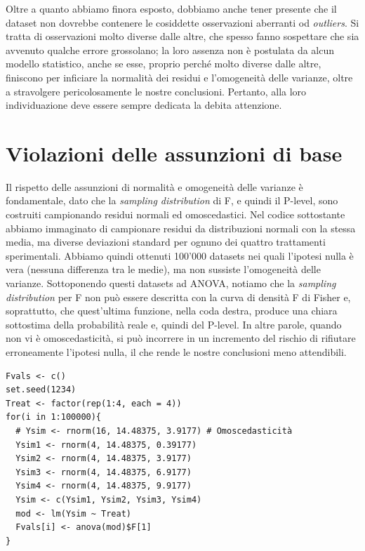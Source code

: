 \documentclass[a4paper,12pt,oneside]{book}
\begin{document}
Oltre a quanto abbiamo finora esposto, dobbiamo anche tener presente che il dataset non dovrebbe contenere le cosiddette osservazioni aberranti od \emph{outliers}. Si tratta di osservazioni molto diverse dalle altre, che spesso fanno sospettare che sia avvenuto qualche errore grossolano; la loro assenza non è postulata da alcun modello statistico, anche se esse, proprio perché molto diverse dalle altre, finiscono per inficiare la normalità dei residui e l'omogeneità delle varianze, oltre a stravolgere pericolosamente le nostre conclusioni. Pertanto, alla loro individuazione deve essere sempre dedicata la debita attenzione.

\hypertarget{violazioni-delle-assunzioni-di-base}{%
\section{Violazioni delle assunzioni di base}\label{violazioni-delle-assunzioni-di-base}}

Il rispetto delle assunzioni di normalità e omogeneità delle varianze è fondamentale, dato che la \emph{sampling distribution} di F, e quindi il P-level, sono costruiti campionando residui normali ed omoscedastici. Nel codice sottostante abbiamo immaginato di campionare residui da distribuzioni normali con la stessa media, ma diverse deviazioni standard per ognuno dei quattro trattamenti sperimentali. Abbiamo quindi ottenuti 100'000 datasets nei quali l'ipotesi nulla è vera (nessuna differenza tra le medie), ma non sussiste l'omogeneità delle varianze. Sottoponendo questi datasets ad ANOVA, notiamo che la \emph{sampling distribution} per F non può essere descritta con la curva di densità F di Fisher e, soprattutto, che quest'ultima funzione, nella coda destra, produce una chiara sottostima della probabilità reale e, quindi del P-level. In altre parole, quando non vi è omoscedasticità, si può incorrere in un incremento del rischio di rifiutare erroneamente l'ipotesi nulla, il che rende le nostre conclusioni meno attendibili.

\begin{verbatim}
Fvals <- c()
set.seed(1234)
Treat <- factor(rep(1:4, each = 4))
for(i in 1:100000){
  # Ysim <- rnorm(16, 14.48375, 3.9177) # Omoscedasticità
  Ysim1 <- rnorm(4, 14.48375, 0.39177)
  Ysim2 <- rnorm(4, 14.48375, 3.9177)
  Ysim3 <- rnorm(4, 14.48375, 6.9177)
  Ysim4 <- rnorm(4, 14.48375, 9.9177)
  Ysim <- c(Ysim1, Ysim2, Ysim3, Ysim4)
  mod <- lm(Ysim ~ Treat)
  Fvals[i] <- anova(mod)$F[1]
}
\end{verbatim}
\end{document}

